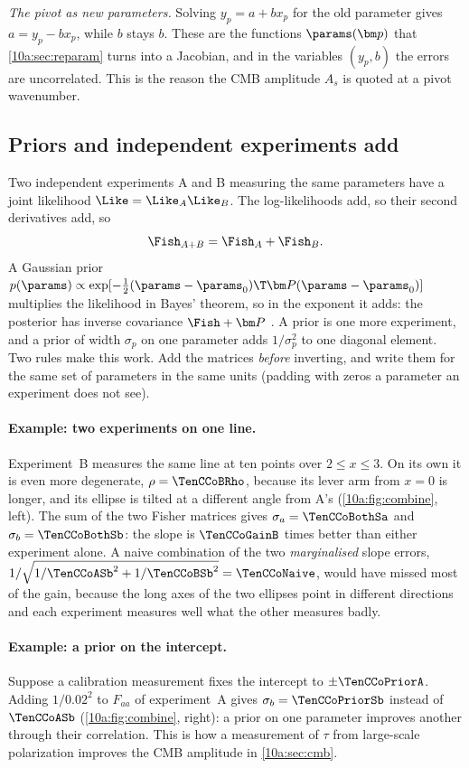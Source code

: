 \emph{The pivot as new parameters.} Solving $y_p=a+bx_p$ for the old parameter gives $a=y_p-bx_p$, while
$b$ stays $b$. These are the functions $\params(\bm p)$ that \cref{10a:sec:reparam} turns into a Jacobian, and in
the variables $(y_p,b)$ the errors are uncorrelated. This is the reason the CMB amplitude $A_s$ is quoted at a
pivot wavenumber.

\subsection{Priors and independent experiments add}
\label{10a:sec:priors}

Two independent experiments A and B measuring the same parameters have a joint likelihood
$\Like=\Like_A\Like_B$. The log-likelihoods add, so their second derivatives add, so
\begin{equation}
  \Fish_{A+B}=\Fish_A+\Fish_B .
  \label{10a:eq:add}
\end{equation}
A Gaussian prior $p(\params)\propto\exp[-\frac12(\params-\params_0)\T\bm P(\params-\params_0)]$ multiplies the likelihood in Bayes'
theorem, so in the exponent it adds: the posterior has inverse covariance $\Fish+\bm P$ .
A prior is one more experiment, and a prior of width $\sigma_p$ on one parameter adds $1/\sigma_p^2$ to one diagonal
element. Two rules make this work. Add the matrices \emph{before} inverting, and write them for the same set of
parameters in the same units (padding with zeros a parameter an experiment does not see).

\paragraph{Example: two experiments on one line.} Experiment~B measures the same line at ten points over
$2\le x\le3$. On its own it is even more degenerate, $\rho=\TenCCoBRho$, because its lever arm from $x=0$ is
longer, and its ellipse is tilted at a different angle from A's (\cref{10a:fig:combine}, left). The sum of the
two Fisher matrices gives $\sigma_a=\TenCCoBothSa$ and $\sigma_b=\TenCCoBothSb$: the slope is $\TenCCoGainB$ times
better than either experiment alone. A naive combination of the two \emph{marginalised} slope errors,
$1/\sqrt{1/\TenCCoASb^2+1/\TenCCoBSb^2}=\TenCCoNaive$, would have missed most of the gain, because the long axes of the two
ellipses point in different directions and each experiment measures well what the other measures badly.

\paragraph{Example: a prior on the intercept.} Suppose a calibration measurement fixes the intercept to
$\pm\TenCCoPriorA$. Adding $1/0.02^2$ to $F_{aa}$ of experiment~A gives $\sigma_b=\TenCCoPriorSb$ instead of
$\TenCCoASb$ (\cref{10a:fig:combine}, right): a prior on one parameter improves another through their
correlation. This is how a measurement of $\tau$ from large-scale polarization improves the CMB amplitude in
\cref{10a:sec:cmb}.

